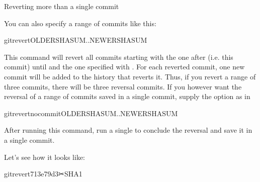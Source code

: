 \ignorespaces \begin{findoutmore}[label={index-6}, before title={\thetcbcounter\ }, check odd page=true]{Reverting more than a single commit}
\label{\detokenize{basics/101-137-history:index-6}}

\sphinxAtStartPar
You can also specify a range of commits like this:

\begin{sphinxVerbatim}[commandchars=\\\{\}]
gitrevertOLDER\PYGZus{}SHASUM..NEWERSHASUM
\end{sphinxVerbatim}

\sphinxAtStartPar
This command will revert all commits starting with the one after
 (i.e.  this commit) until and 
the one specified with .
For each reverted commit, one new commit will be added to the history that
reverts it. Thus, if you revert a range of three commits, there will be three
reversal commits. If you however want the reversal of a range of commits
saved in a single commit, supply the  option as in

\begin{sphinxVerbatim}[commandchars=\\\{\}]
gitrevert\PYGZhy{}\PYGZhy{}no\PYGZhy{}commitOLDER\PYGZus{}SHASUM..NEWERSHASUM
\end{sphinxVerbatim}

\sphinxAtStartPar
After running this command, run a single  to conclude the
reversal and save it in a single commit.


\end{findoutmore}

\sphinxAtStartPar
Let’s see how it looks like:

\begin{sphinxVerbatim}[commandchars=\\\{\}]
gitrevert713e79d3✂SHA1
\end{sphinxVerbatim}

